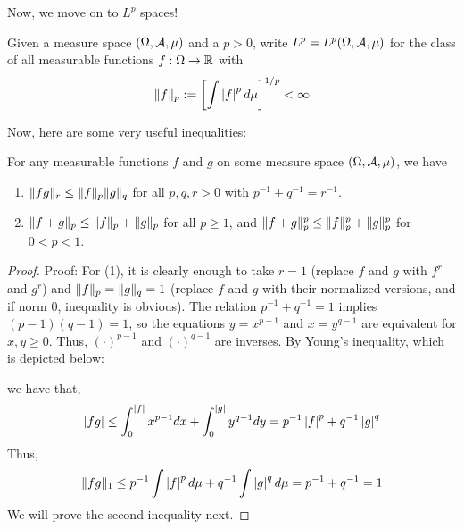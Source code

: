 Now, we move on to $L^{p}$ spaces!

\begin{definition}
    Given a measure space $(\Omega, \cal{A}, \mu)$ and a $p > 0$, write $L^{p} = L^{p}(\Omega, \cal{A}, \mu)$ for the class of all measurable functions $f : \Omega \to \R$ with
    \[ \norm{f}_{p} := \left[\int \abs{f}^{p} d\mu\right]^{1/p} < \infty \]
\end{definition}

Now, here are some very useful inequalities:

\begin{theorem}
    For any measurable functions $f$ and $g$ on some measure space $(\Omega, \cal{A}, \mu)$, we have
    \begin{enumerate}
        \item $\norm{fg}_{r} \leq \norm{f}_{p}\norm{g}_{q}$ for all $p, q, r > 0$ with $p^{-1} + q^{-1} = r^{-1}$.
        \item $\norm{f + g}_{p}\leq \norm{f}_{p} + \norm{g}_{p}$ for all $p \geq 1$, and $\norm{f + g}_{p}^{p} \leq \norm{f}_{p}^{p} + \norm{g}_{p}^{p}$ for $0 < p < 1$. 
    \end{enumerate}
\end{theorem}
\begin{proof}{Proof:}
    For (1), it is clearly enough to take $r = 1$ (replace $f$ and $g$ with $f^{r}$ and $g^{r}$) and $\norm{f}_p = \norm{g}_{q} = 1$ (replace $f$ and $g$ with their normalized versions, and if norm 0, inequality is obvious). The relation $p^{-1} + q^{-1} = 1$ implies $(p - 1)(q - 1) = 1$, so the equations $y = x^{p -1}$ and $x = y^{q - 1}$ are equivalent for $x, y \geq 0$. Thus, $(\cdot)^{p - 1}$ and $(\cdot)^{q - 1}$ are inverses. By Young's inequality, which is depicted below:

    we have that,
    \[ \abs{fg} \leq \int_{0}^{\abs{f}}x^{p - 1}dx + \int_{0}^{\abs{g}}y^{q - 1}dy = p^{-1}\abs{f}^{p} + q^{-1}\abs{g}^{q} \]
    Thus, 
    \[ \norm{fg}_{1} \leq p^{-1} \int \abs{f}^{p}d\mu + q^{-1} \int \abs{g}^{q}d\mu = p^{-1} + q^{-1} = 1 \]
    We will prove the second inequality next.
\end{proof}